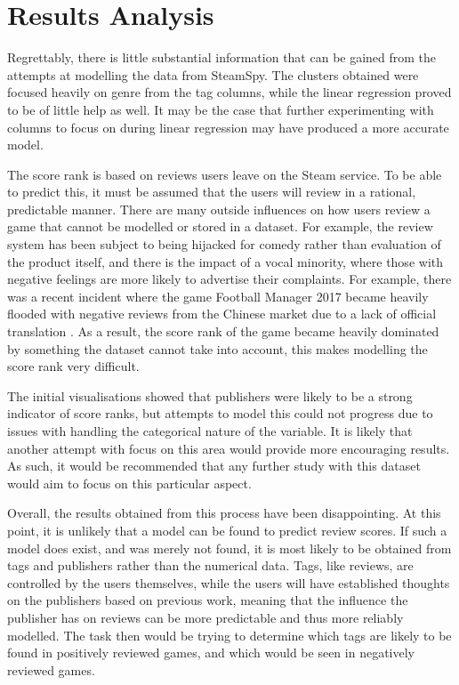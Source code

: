 \documentclass[results.tex]{subfiles}
\begin{document}
\section{Results Analysis} %
\label{sec:results}
Regrettably, there is little substantial information that can be gained from
the attempts at modelling the data from SteamSpy. The clusters obtained were
focused heavily on genre from the tag columns, while the linear regression
proved to be of little help as well. It may be the case that further
experimenting with columns to focus on during linear regression may have
produced a more accurate model.

The score rank is based on reviews users leave on the Steam service. To be able
to predict this, it must be assumed that the users will review in a rational,
predictable manner. There are many outside influences on how users review a game
that cannot be modelled or stored in a dataset. For example, the review system
has been subject to being hijacked for comedy rather than evaluation of the
product itself, and there is the impact of a vocal minority, where those with
negative feelings are more likely to advertise their complaints. For example,
there was a recent incident where the game Football Manager 2017 became heavily
flooded with negative reviews from the Chinese market due to a lack of official
translation \cite{football_manager}. As a result, the score rank of the game
became heavily dominated by something the dataset cannot take into account, this
makes modelling the score rank very difficult.

The initial visualisations showed that publishers were likely to be a strong
indicator of score ranks, but attempts to model this could not progress due to
issues with handling the categorical nature of the variable. It is likely that
another attempt with focus on this area would provide more encouraging results.
As such, it would be recommended that any further study with this dataset would
aim to focus on this particular aspect.

Overall, the results obtained from this process have been disappointing. At this
point, it is unlikely that a model can be found to predict review scores. If
such a model does exist, and was merely not found, it is most likely to be
obtained from tags and publishers rather than the numerical data. Tags, like
reviews, are controlled by the users themselves, while the users will have
established thoughts on the publishers based on previous work, meaning that
the influence the publisher has on reviews can be more predictable and thus more
reliably modelled. The task then would be trying to determine which tags are
likely to be found in positively reviewed games, and which would be seen in
negatively reviewed games.
\end{document}
